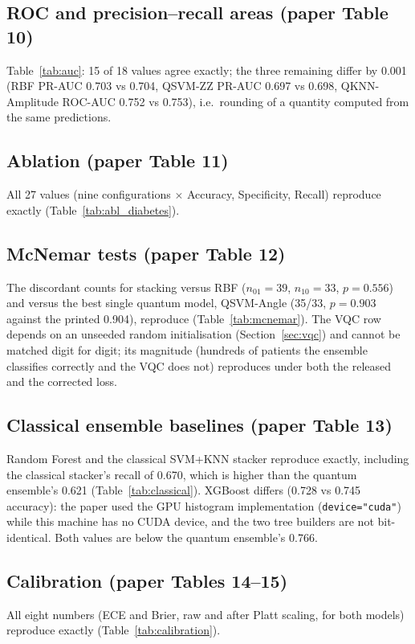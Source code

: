 \documentclass[11pt,a4paper]{article}
\newcommand{\code}[1]{\texttt{\small #1}}
\newcommand{\tabdir}{../reimplementation/tex/}
\begin{document}
\subsection{ROC and precision--recall areas (paper Table 10)}
\label{sec:auc}
Table~\ref{tab:auc}: 15 of 18 values agree exactly; the three remaining differ by 0.001 (RBF PR-AUC 0.703 vs 0.704, QSVM-ZZ PR-AUC 0.697 vs 0.698, QKNN-Amplitude ROC-AUC 0.752 vs 0.753), i.e.\ rounding of a quantity computed from the same predictions.


\subsection{Ablation (paper Table 11)}
All 27 values (nine configurations $\times$ Accuracy, Specificity, Recall) reproduce exactly (Table~\ref{tab:abl_diabetes}).


\subsection{McNemar tests (paper Table 12)}
The discordant counts for stacking versus RBF ($n_{01}=39$, $n_{10}=33$, $p=0.556$) and versus the best single quantum model, QSVM-Angle (35/33, $p=0.903$ against the printed 0.904), reproduce (Table~\ref{tab:mcnemar}). The VQC row depends on an unseeded random initialisation (Section~\ref{sec:vqc}) and cannot be matched digit for digit; its magnitude (hundreds of patients the ensemble classifies correctly and the VQC does not) reproduces under both the released and the corrected loss.


\subsection{Classical ensemble baselines (paper Table 13)}
\label{sec:classical}
Random Forest and the classical SVM+KNN stacker reproduce exactly, including the classical stacker's recall of 0.670, which is higher than the quantum ensemble's 0.621 (Table~\ref{tab:classical}). XGBoost differs (0.728 vs 0.745 accuracy): the paper used the GPU histogram implementation (\code{device="cuda"}) while this machine has no CUDA device, and the two tree builders are not bit-identical. Both values are below the quantum ensemble's 0.766.


\subsection{Calibration (paper Tables 14--15)}
All eight numbers (ECE and Brier, raw and after Platt scaling, for both models) reproduce exactly (Table~\ref{tab:calibration}).

\end{document}
